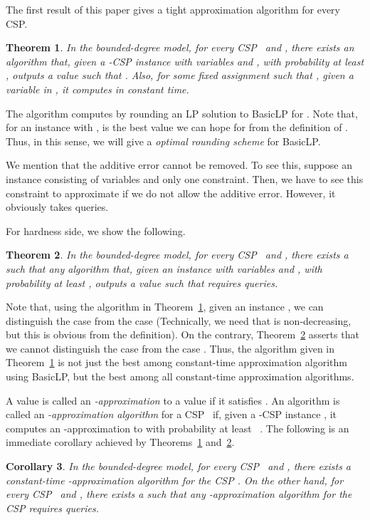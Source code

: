 \documentclass[letterpaper, 11pt]{article}
\newtheorem{theorem}{Theorem}[section]
\newtheorem{corollary}[theorem]{Corollary}
\newcommand{\blp}{\textsf{BasicLP}\xspace}
\begin{document}
The first result of this paper gives a tight approximation algorithm for every CSP.
\begin{theorem}\label{thr:upper}
  In the bounded-degree model,
  for every CSP~ and ,
  there exists an algorithm that,
  given a -CSP instance  with  variables and ,
  with probability at least ,
  outputs a value  such that .
  Also, 
  for some fixed assignment  such that ,
  given a variable  in ,
  it computes  in constant time.
\end{theorem}
The algorithm computes  by rounding an LP solution to \blp for .
Note that, for an instance  with ,
 is the best value we can hope for from the definition of .
Thus, in this sense, we will give a \textit{optimal rounding scheme} for \blp.

We mention that the additive error  cannot be removed.
To see this, 
suppose an instance  consisting of  variables and only one constraint.
Then, we have to see this constraint to approximate  if we do not allow the additive error.
However, it obviously takes  queries.

For hardness side, we show the following.
\begin{theorem}\label{thr:lower}
  In the bounded-degree model,
  for every CSP~ and ,
  there exists a  such that
  any algorithm that,
  given an instance  with  variables and ,
  with probability at least ,
  outputs a value  such that  requires  queries.
\end{theorem}
Note that, using the algorithm in Theorem~\ref{thr:upper}, given an instance ,
we can distinguish the case  from the case 
(Technically, we need that  is non-decreasing, but this is obvious from the definition).
On the contrary, Theorem~\ref{thr:lower} asserts that we cannot distinguish the case  from the case .
Thus, the algorithm given in Theorem~\ref{thr:upper} is not just the best among constant-time approximation algorithm using \blp,
but the best among all constant-time approximation algorithms.

A value  is called an \textit{-approximation} to a value  if it satisfies .
An algorithm is called an \textit{-approximation algorithm} for a CSP~ if,
given a -CSP instance ,
it computes an -approximation to  with probability at least ~\cite{NO08,PR07}.
The following is an immediate corollary achieved by Theorems~\ref{thr:upper} and~\ref{thr:lower}.
\begin{corollary}
  In the bounded-degree model, 
  for every CSP~ and ,
  there exists a constant-time -approximation algorithm for the CSP .
  On the other hand, 
  for every CSP~ and , there exists a  such that 
  any -approximation algorithm for the CSP  requires  queries.
\end{corollary}
\end{document}
